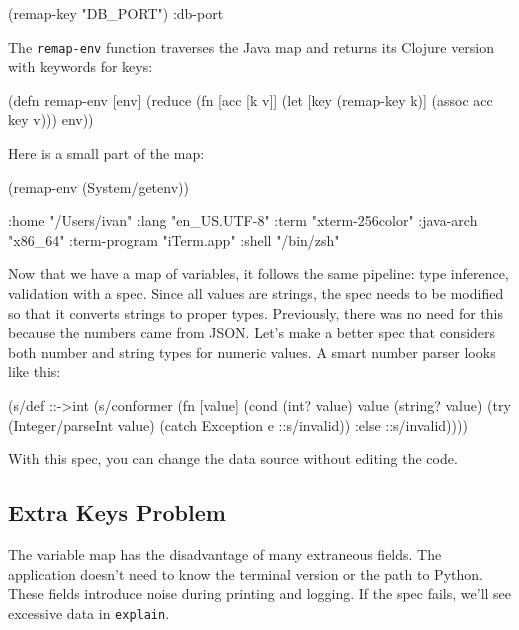 \begin{clojure}
(remap-key "DB_PORT")
:db-port
\end{clojure}


The \verb|remap-env| function traverses the Java map and returns its Clojure version with keywords for keys:

\begin{clojure}
(defn remap-env [env]
  (reduce
   (fn [acc [k v]]
     (let [key (remap-key k)]
       (assoc acc key v)))
   {}
   env))
\end{clojure}

Here is a small part of the map:

\begin{clojure}
(remap-env (System/getenv))

{:home "/Users/ivan"
 :lang "en_US.UTF-8"
 :term "xterm-256color"
 :java-arch "x86_64"
 :term-program "iTerm.app"
 :shell "/bin/zsh"}
\end{clojure}

Now that we have a map of variables, it follows the same pipeline: type inference, validation with a spec. Since all values are strings, the spec needs to be modified so that it converts strings to proper types. Previously, there was no need for this because the numbers came from JSON. Let's make a better spec that considers both number and string types for numeric values. A smart number parser looks like this:

\begin{clojure}
(s/def ::->int
  (s/conformer
   (fn [value]
     (cond
       (int? value) value
       (string? value)
       (try (Integer/parseInt value)
            (catch Exception e
              ::s/invalid))
       :else ::s/invalid))))
\end{clojure}

\noindent
With this spec, you can change the data source without editing the code.

\subsection{Extra Keys Problem}

The variable map has the disadvantage of many extraneous fields. The application doesn't need to know the terminal version or the path to Python. These fields introduce noise during printing and logging. If the spec fails, we'll see excessive data in \verb|explain|.

